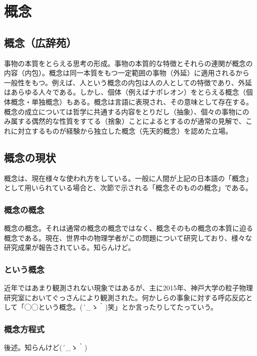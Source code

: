 \chapter{概念}

\section{概念（広辞苑）}
事物の本質をとらえる思考の形成。事物の本質的な特徴とそれらの連関が概念の内容（内包）。概念は同一本質をもつ一定範囲の事物（外延）に適用されるから一般性をもつ。例えば、人という概念の内包は人の人としての特徴であり、外延はあらゆる人々である。しかし、個体（例えばナポレオン）をとらえる概念（個体概念・単独概念）もある。概念は言語に表現され、その意味として存在する。概念の成立については哲学に共通する内容をとりだし（抽象）、個々の事物にのみ属する偶然的な性質をすてる（捨象）ことによるとするのが通常の見解で、これに対立するものが経験から独立した概念（先天的概念）を認めた立場。\\

\section{概念の現状}
概念は、現在様々な使われ方をしている。一般に人間が上記の日本語の「概念」として用いられている場合と、次節で示される「概念そのものの概念」である。\\

\subsection{概念の概念}
概念の概念。それは通常の概念の概念ではなく、概念そのもの概念の本質に迫る概念である。現在、世界中の物理学者がこの問題について研究しており、様々な研究成果が報告されている。知らんけど。

\subsection{という概念}
近年ではあまり観測されない現象ではあるが、主に2015年、神戸大学の粒子物理研究室においてぐっさんにより観測された。何かしらの事象に対する呼応反応として「◯◯という概念。{\sf (´\_ゝ｀)}笑」とか言ったりしてたっていう。

\subsection{概念方程式}
後述。知らんけど\sf(´\_ゝ｀)

